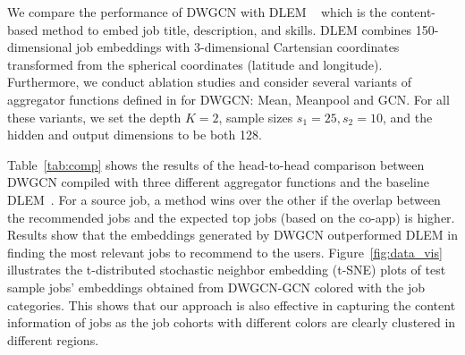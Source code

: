 \documentclass[manuscript,screen,review]{acmart}
\begin{document}
We compare the performance of DWGCN with DLEM ~\cite{zhao:2021embedding} which is the content-based method to embed job title, description, and skills. DLEM combines 150-dimensional job embeddings with 3-dimensional Cartensian coordinates transformed from the spherical coordinates (latitude and longitude). Furthermore, we conduct ablation studies and consider several variants of aggregator functions defined in \cite{hamilton2017inductive} for DWGCN: Mean, Meanpool and GCN. For all these variants, we set the depth $K=2$, sample sizes $s_1=25,s_2=10$, and the hidden and output dimensions to be both 128.



Table~\ref{tab:comp} shows the results of the head-to-head comparison between DWGCN compiled with three different aggregator functions and the baseline DLEM~\cite{zhao:2021embedding}. For a source job, a method wins over the other if the overlap between the recommended jobs and the expected top jobs (based on the co-app) is higher. Results show that the embeddings generated by DWGCN outperformed DLEM in finding the most relevant jobs to recommend to the users. Figure~\ref{fig:data_vis} illustrates the t-distributed stochastic neighbor embedding (t-SNE) plots of test sample jobs’ embeddings obtained from DWGCN-GCN colored with the job categories. This shows that our approach is also effective in capturing the content information of jobs as the job cohorts with different colors are clearly clustered in different regions.
\end{document}
